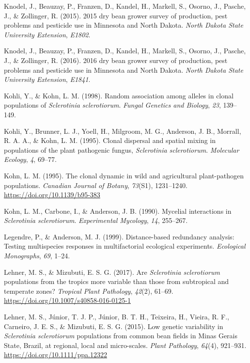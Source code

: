 \documentclass[fleqn,10pt,lineno]{wlpeerj} %
\theoremstyle{definition}
\theoremstyle{definition}
\theoremstyle{definition}
\theoremstyle{remark}
\begin{document}
\hypertarget{ref-knodel2015dry}{}
Knodel, J., Beauzay, P., Franzen, D., Kandel, H., Markell, S., Osorno,
J., Pasche, J., \& Zollinger, R. (2015). 2015 dry bean grower survey of
production, pest problems and pesticide use in Minnesota and North
Dakota. \emph{North Dakota State University Extension}, \emph{E1802}.

\hypertarget{ref-knodel2016dry}{}
Knodel, J., Beauzay, P., Franzen, D., Kandel, H., Markell, S., Osorno,
J., Pasche, J., \& Zollinger, R. (2016). 2016 dry bean grower survey of
production, pest problems and pesticide use in Minnesota and North
Dakota. \emph{North Dakota State University Extension}, \emph{E1841}.

\hypertarget{ref-kohli1998random}{}
Kohli, Y., \& Kohn, L. M. (1998). Random association among alleles in
clonal populations of \emph{Sclerotinia sclerotiorum}. \emph{Fungal
Genetics and Biology}, \emph{23}, 139--149.

\hypertarget{ref-kohli1995clonal}{}
Kohli, Y., Brunner, L. J., Yoell, H., Milgroom, M. G., Anderson, J. B.,
Morrall, R. A. A., \& Kohn, L. M. (1995). Clonal dispersal and spatial
mixing in populations of the plant pathogenic fungus, \emph{Sclerotinia
sclerotiorum}. \emph{Molecular Ecology}, \emph{4}, 69--77.

\hypertarget{ref-kohn1995clonal}{}
Kohn, L. M. (1995). The clonal dynamic in wild and agricultural
plant-pathogen populations. \emph{Canadian Journal of Botany},
\emph{73}(S1), 1231--1240. \url{https://doi.org/10.1139/b95-383}

\hypertarget{ref-kohn1990mycelial}{}
Kohn, L. M., Carbone, I., \& Anderson, J. B. (1990). Mycelial
interactions in \emph{Sclerotinia sclerotiorum}. \emph{Experimental
Mycology}, \emph{14}, 255--267.

\hypertarget{ref-legendre1999distance}{}
Legendre, P., \& Anderson, M. J. (1999). Distance-based redundancy
analysis: Testing multispecies responses in multifactorial ecological
experiments. \emph{Ecological Monographs}, \emph{69}, 1--24.

\hypertarget{ref-lehner2017sclerotinia}{}
Lehner, M. S., \& Mizubuti, E. S. G. (2017). Are \emph{Sclerotinia
sclerotiorum} populations from the tropics more variable than those from
subtropical and temperate zones? \emph{Tropical Plant Pathology},
\emph{42}(2), 61--69. \url{https://doi.org/10.1007/s40858-016-0125-1}

\hypertarget{ref-lehner2015genetic}{}
Lehner, M. S., Júnior, T. J. P., Júnior, B. T. H., Teixeira, H., Vieira,
R. F., Carneiro, J. E. S., \& Mizubuti, E. S. G. (2015). Low genetic
variability in \emph{Sclerotinia sclerotiorum} populations from common
bean fields in Minas Gerais State, Brazil, at regional, local and
micro-scales. \emph{Plant Pathology}, \emph{64}(4), 921--931.
\url{https://doi.org/10.1111/ppa.12322}
\end{document}
